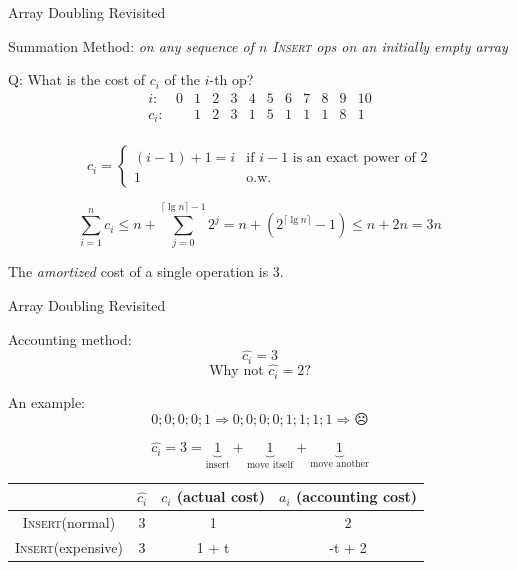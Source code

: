 \documentclass{beamer}
\begin{document}
\begin{frame}{Array Doubling Revisited}
  \begin{block}{Summation Method:}
    \emph{on any sequence of $n$ \textsc{Insert} ops on an initially empty
    array}

  \vspace{0.30cm}
  Q: What is the cost of $c_i$ of the $i$-th op?
  \[
    \begin{array}{cccccccccccc}
      i: 	& 0 & 1 & 2 & 3 & 4 & 5 & 6 & 7 & 8 & 9 & 10 \\
      c_i:  &   & 1 & 2 & 3 & 1 & 5 & 1 & 1 & 1 & 8 & 1  \\
    \end{array}
  \]

	\begin{displaymath}
	  c_i = \left\{ \begin{array}{ll}
	    (i-1)+1 = i & \textrm{if $i - 1$ is an exact power of 2}\\
	    1 & \textrm{o.w.}
	  \end{array} \right.
	\end{displaymath}

  \[
	\sum_{i=1}^{n} c_i \le n + \sum_{j=0}^{\lceil \lg n \rceil - 1} 2^{j} = n +
	(2^{\lceil \lg n \rceil} - 1) \le n + 2n = 3n
  \]

  The \emph{amortized} cost of a single operation is 3.
  \end{block}
\end{frame}
\begin{frame}{Array Doubling Revisited}
  \begin{block}{Accounting method:}
	\[ \hat{c_i} = 3 \]
	\[ \textrm{Why not } \hat{c_i} = 2 ?\]

    An example:
    \[ 0;0;0;0;1 \Rightarrow 0;0;0;0;1;1;1;1 \Rightarrow \frownie{} \]

	\[
	  \hat{c_i} = 3 = \underbrace{1}_{\textrm{insert}} +
	  \underbrace{1}_{\textrm{move itself}} + \underbrace{1}_{\textrm{move another}}
	\]

  \begin{table}
    \begin{tabular}{c|ccc}
	  & $\hat{c_i}$ & $c_i$ (actual cost) & $a_i$ (accounting cost)
	  \\ \hline
	  \textsc{Insert}(normal) & 3 & 1 & 2 \\
	  \textsc{Insert}(expensive) & 3 & 1 + t & -t + 2
    \end{tabular}
  \end{table}

  \end{block}
\end{frame}
\end{document}
